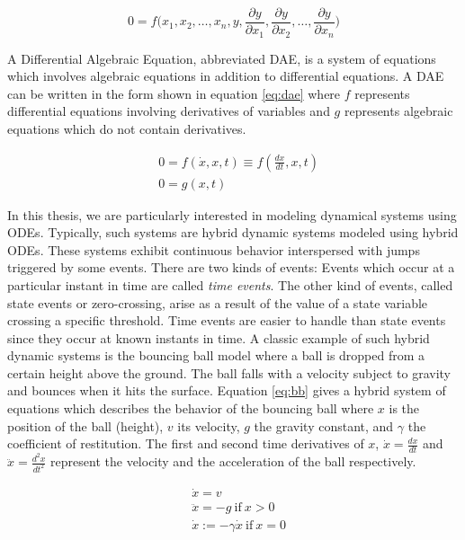 \begin{equation}
0 = f\biggl(x_1,x_2,\dots, x_n,y,\frac{\partial y}{\partial x_1},\frac{\partial y}{\partial x_2},\dots,\frac{\partial y}{\partial x_n}\biggl)
\label{eq:pde}
\end{equation} 

A Differential Algebraic Equation, abbreviated DAE, is a system of equations which involves algebraic equations in addition to differential equations. A DAE can be written in the form shown in equation \ref{eq:dae} where $f$ represents differential equations involving derivatives of variables and $g$ represents algebraic equations which do not contain derivatives.

\begin{equation}
\begin{aligned}
&0 = f(\dot{x},x,t) \equiv f(\frac{dx}{dt},x,t) \\
&0 = g(x,t)
\end{aligned}
\label{eq:dae}
\end{equation}
  
In this thesis, we are particularly interested in modeling dynamical systems using ODEs. Typically, such systems are hybrid dynamic systems modeled using hybrid ODEs. These systems exhibit continuous behavior interspersed with jumps triggered by some events. There are two kinds of events: Events which occur at a particular instant in time are called \textit{time events}. The other kind of events, called state events or zero-crossing, arise as a result of the value of a state variable crossing a specific threshold. Time events are easier to handle than state events since they occur at known instants in time. A classic example of such hybrid dynamic systems is the bouncing ball model where a ball is dropped from a certain height above the ground. The ball falls with a velocity subject to gravity and bounces when it hits the surface. Equation \ref{eq:bb} gives a hybrid system of equations which describes the behavior of the bouncing ball where $x$ is the position of the ball (height), $v$ its velocity, $g$ the gravity constant, and $\gamma$ the coefficient of restitution. The first and second time derivatives of $x$, $\dot{x} = \frac{dx}{dt}$ and $\ddot{x} = \frac{d^2x}{dt^2}$ represent the velocity and the acceleration of the ball respectively. 

\begin{equation}
\begin{aligned}
&\dot{x} = v\\
&\ddot{x} = -g\ \text{if}\ x > 0\\
&\dot{x} := -\gamma \dot{x}\ \text{if}\ x = 0 
\end{aligned}
\label{eq:bb}
\end{equation}  

